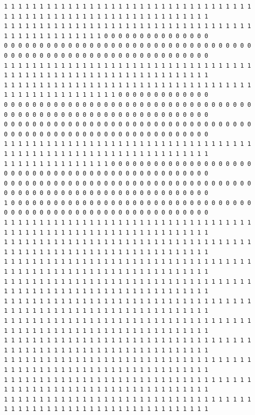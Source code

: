 \documentclass [10 pt, a4 paper]{report}
\begin{document}
\begin{lstlisting}[caption=Output of the simulation once it is finished, label={lst:code1}, frame=single]
1 1 1 1 1 1 1 1 1 1 1 1 1 1 1 1 1 1 1 1 1 1 1 1 1 1 1 1 1 1 1 1 1 1 1 1 1 1 1 1 1 1 1 1 1 1 1 1 1 1 1 1 1 1 1 1 1 1 1 1 1 1 1 1
1 1 1 1 1 1 1 1 1 1 1 1 1 1 1 1 1 1 1 1 1 1 1 1 1 1 1 1 1 1 1 1 1 1 1 1 1 1 1 1 1 1 1 1 1 1 1 1 1 0 0 0 0 0 0 0 0 0 0 0 0 0 0 0
0 0 0 0 0 0 0 0 0 0 0 0 0 0 0 0 0 0 0 0 0 0 0 0 0 0 0 0 0 0 0 0 0 0 0 0 0 0 0 0 0 0 0 0 0 0 0 0 0 0 0 0 0 0 0 0 0 0 0 0 0 0 0 0
1 1 1 1 1 1 1 1 1 1 1 1 1 1 1 1 1 1 1 1 1 1 1 1 1 1 1 1 1 1 1 1 1 1 1 1 1 1 1 1 1 1 1 1 1 1 1 1 1 1 1 1 1 1 1 1 1 1 1 1 1 1 1 1
1 1 1 1 1 1 1 1 1 1 1 1 1 1 1 1 1 1 1 1 1 1 1 1 1 1 1 1 1 1 1 1 1 1 1 1 1 1 1 1 1 1 1 1 1 1 1 1 1 1 1 0 0 0 0 0 0 0 0 0 0 0 0 0
0 0 0 0 0 0 0 0 0 0 0 0 0 0 0 0 0 0 0 0 0 0 0 0 0 0 0 0 0 0 0 0 0 0 0 0 0 0 0 0 0 0 0 0 0 0 0 0 0 0 0 0 0 0 0 0 0 0 0 0 0 0 0 0
0 0 0 0 0 0 0 0 0 0 0 0 0 0 0 0 0 0 0 0 0 0 0 0 0 0 0 0 0 0 0 0 0 0 0 0 0 0 0 0 0 0 0 0 0 0 0 0 0 0 0 0 0 0 0 0 0 0 0 0 0 0 0 0
1 1 1 1 1 1 1 1 1 1 1 1 1 1 1 1 1 1 1 1 1 1 1 1 1 1 1 1 1 1 1 1 1 1 1 1 1 1 1 1 1 1 1 1 1 1 1 1 1 1 1 1 1 1 1 1 1 1 1 1 1 1 1 1
1 1 1 1 1 1 1 1 1 1 1 1 1 1 1 0 0 0 0 0 0 0 0 0 0 0 0 0 0 0 0 0 0 0 0 0 0 0 0 0 0 0 0 0 0 0 0 0 0 0 0 0 0 0 0 0 0 0 0 0 0 0 0 0
0 0 0 0 0 0 0 0 0 0 0 0 0 0 0 0 0 0 0 0 0 0 0 0 0 0 0 0 0 0 0 0 0 0 0 0 0 0 0 0 0 0 0 0 0 0 0 0 0 0 0 0 0 0 0 0 0 0 0 0 0 0 0 0
1 0 0 0 0 0 0 0 0 0 0 0 0 0 0 0 0 0 0 0 0 0 0 0 0 0 0 0 0 0 0 0 0 0 0 0 0 0 0 0 0 0 0 0 0 0 0 0 0 0 0 0 0 0 0 0 0 0 0 0 0 0 0 0
1 1 1 1 1 1 1 1 1 1 1 1 1 1 1 1 1 1 1 1 1 1 1 1 1 1 1 1 1 1 1 1 1 1 1 1 1 1 1 1 1 1 1 1 1 1 1 1 1 1 1 1 1 1 1 1 1 1 1 1 1 1 1 1
1 1 1 1 1 1 1 1 1 1 1 1 1 1 1 1 1 1 1 1 1 1 1 1 1 1 1 1 1 1 1 1 1 1 1 1 1 1 1 1 1 1 1 1 1 1 1 1 1 1 1 1 1 1 1 1 1 1 1 1 1 1 1 1
1 1 1 1 1 1 1 1 1 1 1 1 1 1 1 1 1 1 1 1 1 1 1 1 1 1 1 1 1 1 1 1 1 1 1 1 1 1 1 1 1 1 1 1 1 1 1 1 1 1 1 1 1 1 1 1 1 1 1 1 1 1 1 1
1 1 1 1 1 1 1 1 1 1 1 1 1 1 1 1 1 1 1 1 1 1 1 1 1 1 1 1 1 1 1 1 1 1 1 1 1 1 1 1 1 1 1 1 1 1 1 1 1 1 1 1 1 1 1 1 1 1 1 1 1 1 1 1
1 1 1 1 1 1 1 1 1 1 1 1 1 1 1 1 1 1 1 1 1 1 1 1 1 1 1 1 1 1 1 1 1 1 1 1 1 1 1 1 1 1 1 1 1 1 1 1 1 1 1 1 1 1 1 1 1 1 1 1 1 1 1 1
1 1 1 1 1 1 1 1 1 1 1 1 1 1 1 1 1 1 1 1 1 1 1 1 1 1 1 1 1 1 1 1 1 1 1 1 1 1 1 1 1 1 1 1 1 1 1 1 1 1 1 1 1 1 1 1 1 1 1 1 1 1 1 1
1 1 1 1 1 1 1 1 1 1 1 1 1 1 1 1 1 1 1 1 1 1 1 1 1 1 1 1 1 1 1 1 1 1 1 1 1 1 1 1 1 1 1 1 1 1 1 1 1 1 1 1 1 1 1 1 1 1 1 1 1 1 1 1
1 1 1 1 1 1 1 1 1 1 1 1 1 1 1 1 1 1 1 1 1 1 1 1 1 1 1 1 1 1 1 1 1 1 1 1 1 1 1 1 1 1 1 1 1 1 1 1 1 1 1 1 1 1 1 1 1 1 1 1 1 1 1 1
1 1 1 1 1 1 1 1 1 1 1 1 1 1 1 1 1 1 1 1 1 1 1 1 1 1 1 1 1 1 1 1 1 1 1 1 1 1 1 1 1 1 1 1 1 1 1 1 1 1 1 1 1 1 1 1 1 1 1 1 1 1 1 1
1 1 1 1 1 1 1 1 1 1 1 1 1 1 1 1 1 1 1 1 1 1 1 1 1 1 1 1 1 1 1 1 1 1 1 1 1 1 1 1 1 1 1 1 1 1 1 1 1 1 1 1 1 1 1 1 1 1 1 1 1 1 1 1

\end{lstlisting}
\end{document}
